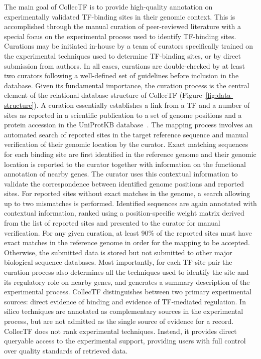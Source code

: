 The main goal of CollecTF is to provide high-quality annotation on
experimentally validated TF-binding sites in their genomic context. This is
accomplished through the manual curation of peer-reviewed literature with a
special focus on the experimental process used to identify TF-binding
sites. Curations may be initiated in-house by a team of curators specifically
trained on the experimental techniques used to determine TF-binding sites, or
by direct submission from authors. In all cases, curations are double-checked
by at least two curators following a well-defined set of guidelines before
inclusion in the database. Given its fundamental importance, the curation
process is the central element of the relational database structure of CollecTF
(Figure~\ref{fig:data-structure}). A curation essentially establishes a link
from a TF and a number of sites as reported in a scientific publication to a
set of genome positions and a protein accession in the UniProtKB
database~\citep{uniprot2014uniprot}. The mapping process involves an automated
search of reported sites in the target reference sequence and manual
verification of their genomic location by the curator. Exact matching sequences
for each binding site are first identified in the reference genome and their
genomic location is reported to the curator together with information on the
functional annotation of nearby genes. The curator uses this contextual
information to validate the correspondence between identified genome positions
and reported sites. For reported sites without exact matches in the genome, a
search allowing up to two mismatches is performed. Identified sequences are
again annotated with contextual information, ranked using a position-specific
weight matrix derived from the list of reported sites and presented to the
curator for manual verification. For any given curation, at least 90\% of the
reported sites must have exact matches in the reference genome in order for the
mapping to be accepted. Otherwise, the submitted data is stored but not
submitted to other major biological sequence databases. Most importantly, for
each TF-site pair the curation process also determines all the techniques used
to identify the site and its regulatory role on nearby genes, and generates a
summary description of the experimental process. CollecTF distinguishes between
two primary experimental sources: direct evidence of binding and evidence of
TF-mediated regulation. In silico techniques are annotated as complementary
sources in the experimental process, but are not admitted as the single source
of evidence for a record. CollecTF does not rank experimental
techniques. Instead, it provides direct queryable access to the experimental
support, providing users with full control over quality standards of retrieved
data.

